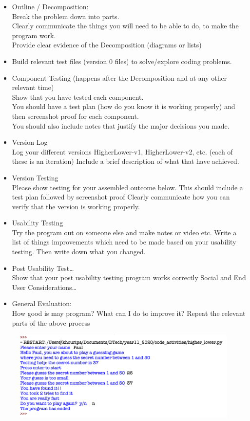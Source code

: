 \documentclass[a4paper,12pt]{article}
\begin{document}
\begin{itemize}
	\item Outline / Decomposition:\\
	Break the problem down into parts. \\
	Clearly communicate the things you will need to be able to do, to make the program work.\\
	Provide clear evidence of the Decomposition (diagrams or lists)
	\item Build relevant test files (version 0 files) to solve/explore coding problems.  
	\item Component Testing (happens after the Decomposition and at any other relevant time)\\
	Show that you have tested each component. \\
	You should have a test plan (how do you know it is working properly) and then screenshot proof for each component.  \\
	You should also include notes that justify the major decisions you made.
	\item Version Log\\
	Log your different versions HigherLower-v1, HigherLower-v2, etc. (each of these is an iteration)
	Include a brief description of what that have achieved.
	\item Version Testing\\
	Please show testing for your assembled outcome below.  
	This should include a test plan followed by screenshot proof
	Clearly communicate how you can verify that the version is working properly.
	\item Usability Testing\\
	Try the program out on someone else and make notes or video etc.
	Write a list of things improvements which need to be made based on your usability testing.  Then write down what you changed.
	\item Post Usability Test…\\
	Show that your post usability testing program works correctly
	Social and End User Considerations…
	\item General Evaluation:\\
	How good is may program? What can I do to improve it?
	Repeat the relevant parts of the above process
\end{itemize}
\newpage



\begin{figure} [!h]
	\centering
	\includegraphics[width=17cm]{screen_shots/higher_lower.png}
\end{figure}
\newpage
\end{document}
